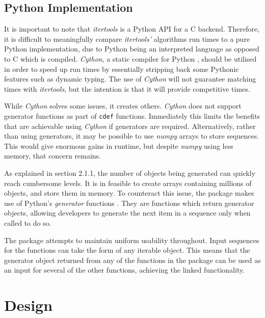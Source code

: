 \documentclass[12pt]{article}
\begin{document}
\subsection{Python Implementation}
It is important to note that \textit{itertools} is a Python API for a C backend. Therefore, it is difficult to meaningfully compare \textit{itertools'} algorithms run times to a pure Python implementation, due to Python being an interpreted language as opposed to C which is compiled. \textit{Cython}, a static compiler for Python \cite{cython}, should be utilised in order to speed up run times by essentially stripping back some Pythonic features such as dynamic typing. The use of \textit{Cython} will not guarantee matching times with \textit{itertools}, but the intention is that it will provide competitive times.

While \textit{Cython} solves some issues, it creates others. \textit{Cython} does not support generator functions as part of \lstinline{cdef} functions. Immediately this limits the benefits that are achievable using \textit{Cython} if generators are required. Alternatively, rather than using generators, it may be possible to use \textit{numpy} arrays to store sequences. This would give enormous gains in runtime, but despite \textit{numpy} using less memory, that concern remains.

As explained in section 2.1.1, the number of objects being generated can quickly reach cumbersome levels. It is in feasible to create arrays containing millions of objects, and store them in memory. To counteract this issue, the package makes use of Python's \textit{generator} functions \cite{generator}. They are functions which return generator objects, allowing developers to generate the next item in a sequence only when called to do so.

The package attempts to maintain uniform usability throughout. Input sequences for the functions can take the form of any iterable object. This means that the generator object returned from any of the functions in the package can be used as an input for several of the other functions, achieving the linked functionality.

\pagebreak

\section{Design}
\end{document}
